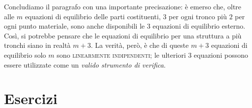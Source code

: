 \noindent Concludiamo il paragrafo con una importante precisazione: è emerso che, oltre alle $m$ equazioni di equilibrio delle parti costituenti, $3$ per ogni tronco più $2$ per ogni punto materiale, sono anche disponibili le $3$ equazioni di equilibrio esterno. Così, si potrebbe pensare che le equazioni di equilibrio per una struttura a più tronchi siano in realtà $m+3$. La verità, però, è che di queste $m+3$ equazioni di equilibrio solo $m$ sono \textsc{linearmente indipendenti}; le ulteriori $3$ equazioni possono essere utilizzate come un \emph{valido strumento di verifica}.
\clearpage
\section{Esercizi}
